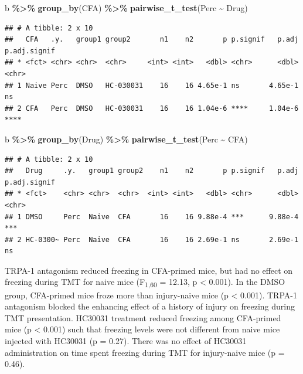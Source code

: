 \documentclass[
]{book}
\newenvironment{Shaded}{\begin{snugshade}}{\end{snugshade}}
\newcommand{\FunctionTok}[1]{\textcolor[rgb]{0.13,0.29,0.53}{\textbf{#1}}}
\newcommand{\NormalTok}[1]{#1}
\newcommand{\SpecialCharTok}[1]{\textcolor[rgb]{0.81,0.36,0.00}{\textbf{#1}}}
\begin{document}
\begin{Shaded}
\begin{Highlighting}[]
\NormalTok{b }\SpecialCharTok{\%\textgreater{}\%}
  \FunctionTok{group\_by}\NormalTok{(CFA) }\SpecialCharTok{\%\textgreater{}\%}
  \FunctionTok{pairwise\_t\_test}\NormalTok{(Perc }\SpecialCharTok{\textasciitilde{}}\NormalTok{ Drug)}
\end{Highlighting}
\end{Shaded}

\begin{verbatim}
## # A tibble: 2 x 10
##   CFA   .y.   group1 group2       n1    n2       p p.signif   p.adj p.adj.signif
## * <fct> <chr> <chr>  <chr>     <int> <int>   <dbl> <chr>      <dbl> <chr>       
## 1 Naive Perc  DMSO   HC-030031    16    16 4.65e-1 ns       4.65e-1 ns          
## 2 CFA   Perc  DMSO   HC-030031    16    16 1.04e-6 ****     1.04e-6 ****
\end{verbatim}

\begin{Shaded}
\begin{Highlighting}[]
\NormalTok{b }\SpecialCharTok{\%\textgreater{}\%}
  \FunctionTok{group\_by}\NormalTok{(Drug) }\SpecialCharTok{\%\textgreater{}\%}
  \FunctionTok{pairwise\_t\_test}\NormalTok{(Perc }\SpecialCharTok{\textasciitilde{}}\NormalTok{ CFA)}
\end{Highlighting}
\end{Shaded}

\begin{verbatim}
## # A tibble: 2 x 10
##   Drug     .y.   group1 group2    n1    n2       p p.signif   p.adj p.adj.signif
## * <fct>    <chr> <chr>  <chr>  <int> <int>   <dbl> <chr>      <dbl> <chr>       
## 1 DMSO     Perc  Naive  CFA       16    16 9.88e-4 ***      9.88e-4 ***         
## 2 HC-0300~ Perc  Naive  CFA       16    16 2.69e-1 ns       2.69e-1 ns
\end{verbatim}

TRPA-1 antagonism reduced freezing in CFA-primed mice, but had no effect on freezing during TMT for naive mice (F\textsubscript{1,60} = 12.13, p \textless{} 0.001). In the DMSO group, CFA-primed mice froze more than injury-naive mice (p \textless{} 0.001). TRPA-1 antagonism blocked the enhancing effect of a history of injury on freezing during TMT presentation. HC30031 treatment reduced freezing among CFA-primed mice (p \textless{} 0.001) such that freezing levels were not different from naive mice injected with HC30031 (p = 0.27). There was no effect of HC30031 administration on time spent freezing during TMT for injury-naive mice (p = 0.46).


\end{document}
